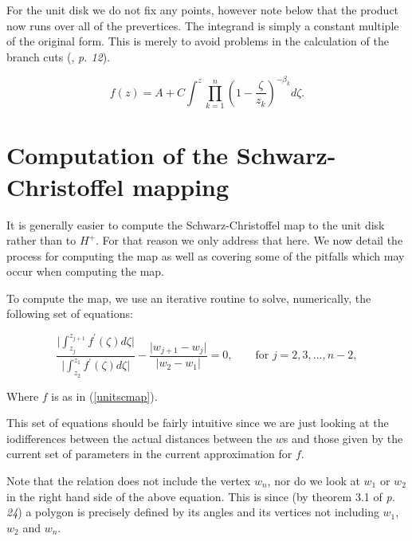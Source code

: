 \documentclass[a4paper,10pt]{amsart}
\newcommand{\sch}{Schwarz-Christoffel }
\begin{document}
For the unit disk we do not fix any points, however note below that the product now runs over all of the prevertices. The integrand is simply a constant multiple of the original form. This is merely to avoid problems in the calculation of the branch cuts (\cite{driscoll}, \emph{p. 12}).

\begin{equation}
\label{unitscmap}
f(z) = A + C \int^z \prod_{k=1}^{n} (1 - \frac{\zeta}{z_k})^{-\beta_k} d\zeta.
\end{equation}






\section{Computation of the \sch mapping}

It is generally easier to compute the \sch map to the unit disk rather than to $H^+$. For that reason we only address that here. We now detail the process for computing the map as well as covering some of the pitfalls which may occur when computing the map.

To compute the map, we use an iterative routine to solve, numerically, the following set of equations:

\begin{equation}
\label{optimizeme}
\frac{\vert \int_{z_j}^{z_{j+1}} f^\prime(\zeta) d\zeta \vert}{\vert \int_{z_2}^{z_{1}} f^\prime(\zeta) d\zeta\vert} - \frac{\vert w_{j+1} - w_j\vert}{\vert w_2 - w_1\vert} = 0, \qquad \text{for } j=2,3,\dots,n-2,
\end{equation}

Where $f$ is as in (\ref{unitscmap}).

This set of equations should be fairly intuitive since we are just looking at the iodifferences between the actual distances between the $w$s and those given by the current set of parameters in the current approximation for $f$.

Note that the relation does not include the vertex $w_n$, nor do we look at $w_1$ or $w_2$ in the right hand side of the above equation. This is since (by theorem 3.1 of \cite{driscoll} \emph{p. 24}) a polygon is precisely defined by its angles and its vertices not including $w_1$, $w_2$ and $w_n$.
\end{document}
